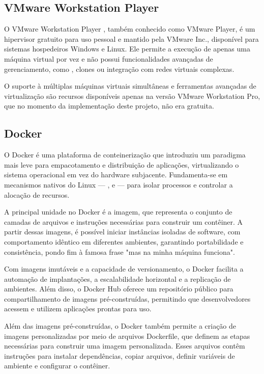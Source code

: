 \subsection{VMware Workstation Player}
\label{subsection:VMware-Player}

O VMware Workstation Player \citep{vmwareplayer2025}, também conhecido como VMware Player, é um hipervisor gratuito para uso pessoal e mantido pela VMware Inc., disponível para sistemas hospedeiros Windows e Linux. Ele permite a execução de apenas uma máquina virtual por vez e não possui funcionalidades avançadas de gerenciamento, como , clones ou integração com redes virtuais complexas.

O suporte à múltiplas máquinas virtuais simultâneas e ferramentas avançadas de virtualização são recursos disponíveis apenas na versão VMware Workstation Pro, que no momento da implementação deste projeto, não era gratuita.

\subsection{Docker}
\label{subsection:Docker}

O Docker \citep{docker2025} é uma plataforma de conteinerização que introduziu um paradigma mais leve para empacotamento e distribuição de aplicações, virtualizando o sistema operacional em vez do hardware subjacente. Fundamenta-se em mecanismos nativos do  Linux --- ,  e  --- para isolar processos e controlar a alocação de recursos.

A principal unidade no Docker é a imagem, que representa o conjunto de camadas de arquivos e instruções necessárias para construir um contêiner. A partir dessas imagens, é possível iniciar instâncias isoladas de software, com comportamento idêntico em diferentes ambientes, garantindo portabilidade e consistência, pondo fim à famosa frase "mas na minha máquina funciona".

Com imagens imutáveis e a capacidade de versionamento, o Docker facilita a automação de implantações, a escalabilidade horizontal e a replicação de ambientes. Além disso, o Docker Hub oferece um repositório público para compartilhamento de imagens pré-construídas, permitindo que desenvolvedores acessem e utilizem aplicações prontas para uso.

Além das imagens pré-construídas, o Docker também permite a criação de imagens personalizadas por meio de arquivos Dockerfile, que definem as etapas necessárias para construir uma imagem personalizada. Esses arquivos contêm instruções para instalar dependências, copiar arquivos, definir variáveis de ambiente e configurar o contêiner.


